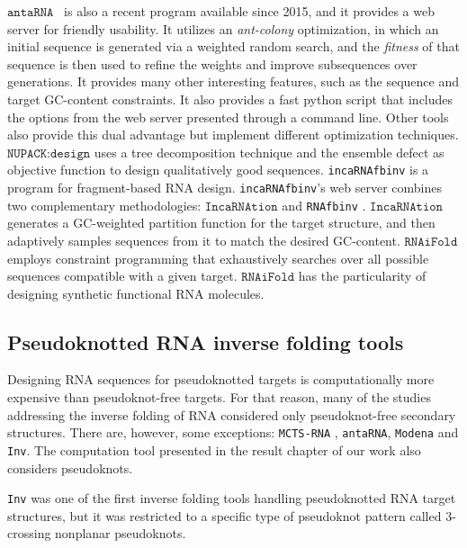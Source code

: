 \(\texttt{antaRNA}\)~\cite{kleinkauf2015antarna} is also a recent program available since 2015, and it provides a web server for friendly usability. It utilizes an \textit{ant-colony} optimization, in which an initial sequence is generated via a weighted random search, and the \textit{fitness} of that sequence is then used to refine the weights and improve subsequences over generations. It provides many other interesting features, such as the sequence and target GC-content constraints. It also provides a fast python script that includes the options from the web server presented through a command line. Other tools also provide this dual advantage but implement different optimization techniques. \(\texttt{NUPACK:design}\) \cite{zadeh2011nucleic} uses a tree decomposition technique and the ensemble defect as objective function to design qualitatively good sequences. \texttt{incaRNAfbinv} \cite{drory2016incarnafbinv} is a program for fragment-based RNA design. \texttt{incaRNAfbinv}'s web server combines two complementary methodologies: \(\texttt{IncaRNAtion}\) \cite{reinharz2013} and \texttt{RNAfbinv} \cite{weinbrand2013rnafbinv}. \(\texttt{IncaRNAtion}\) generates a GC-weighted partition function for the target structure, and then adaptively samples sequences from it to match the desired GC-content. \(\texttt{RNAiFold}\) \cite{garcia2013rnaifold} employs constraint programming that exhaustively searches over all possible sequences compatible with a given target. \(\texttt{RNAiFold}\) \cite{garcia2013rnaifold} has the particularity of  designing synthetic functional RNA molecules.  


\subsection{Pseudoknotted RNA inverse folding tools}
Designing RNA sequences for pseudoknotted targets is computationally more expensive than pseudoknot-free targets. For that reason, many of the studies addressing the inverse folding of RNA considered only pseudoknot-free secondary structures. There are, however, some exceptions: \texttt{MCTS-RNA} \cite{yang2017rna}, \texttt{antaRNA}\cite{kleinkauf2015antarna}, \texttt{Modena} and \texttt{Inv}\cite{gao2010inverse}. The computation tool presented in the result chapter of our work also considers pseudoknots.

\texttt{Inv} was one of the first inverse folding tools handling pseudoknotted RNA target structures, but it was restricted to a specific type of pseudoknot pattern called $3$-crossing nonplanar pseudoknots.

